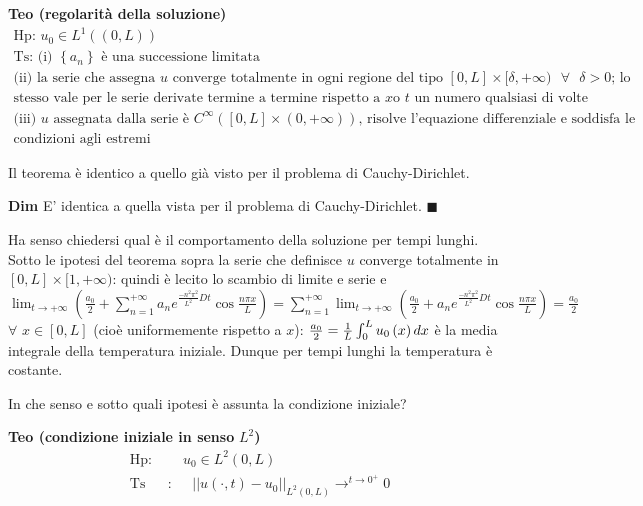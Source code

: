 \documentclass{article}
\begin{document}
\textbf{Teo (regolarit\`{a} della soluzione)}%
\begin{gather*}
\text{Hp: }u_{0}\in L^{1}\left( \left( 0,L\right) \right) \\
\text{Ts: (i) }\left\{ a_{n}\right\} \text{ \`{e} una successione limitata}
\\
\text{(ii) la serie che assegna }u\text{ converge totalmente in ogni regione
del tipo }\left[ 0,L\right] \times \lbrack \delta ,+\infty )\text{ }\forall 
\text{ }\delta >0\text{; lo } \\
\text{stesso vale per le serie derivate termine a termine rispetto a }x\text{
o }t\text{ un numero qualsiasi di volte} \\
\text{(iii) }u\text{ assegnata dalla serie \`{e} }C^{\infty }\left( \left[
0,L\right] \times \left( 0,+\infty \right) \right) \text{, risolve
l'equazione differenziale e soddisfa le} \\
\text{condizioni agli estremi}
\end{gather*}

Il teorema \`{e} identico a quello gi\`{a} visto per il problema di
Cauchy-Dirichlet.

\textbf{Dim} E' identica a quella vista per il problema di Cauchy-Dirichlet. 
$\blacksquare $

Ha senso chiedersi qual \`{e} il comportamento della soluzione per tempi
lunghi. Sotto le ipotesi del teorema sopra la serie che definisce $u$
converge totalmente in $\left[ 0,L\right] \times \lbrack 1,+\infty )$:
quindi \`{e} lecito lo scambio di limite e serie e $\lim_{t\rightarrow
+\infty }\left( \frac{a_{0}}{2}+\sum_{n=1}^{+\infty }a_{n}e^{\frac{-n^{2}\pi
^{2}}{L^{2}}Dt}\cos \frac{n\pi x}{L}\right) =\sum_{n=1}^{+\infty
}\lim_{t\rightarrow +\infty }\left( \frac{a_{0}}{2}+a_{n}e^{\frac{-n^{2}\pi
^{2}}{L^{2}}Dt}\cos \frac{n\pi x}{L}\right) =\frac{a_{0}}{2}$ $\forall $ $%
x\in \left[ 0,L\right] $ (cio\`{e} uniformemente rispetto a $x$): $\frac{%
a_{0}}{2}=\frac{1}{L}\int_{0}^{L}u_{0}\left( x\right) dx$ \`{e} la media
integrale della temperatura iniziale. Dunque per tempi lunghi la temperatura 
\`{e} costante.

In che senso e sotto quali ipotesi \`{e} assunta la condizione iniziale?

\textbf{Teo (condizione iniziale in senso }$L^{2}$\textbf{)}%
\begin{eqnarray*}
\text{Hp}\text{: } &&u_{0}\in L^{2}\left( 0,L\right) \\
\text{Ts} &\text{:}&\text{ }\left\vert \left\vert u\left( \cdot ,t\right)
-u_{0}\right\vert \right\vert _{L^{2}\left( 0,L\right) }\rightarrow
^{t\rightarrow 0^{+}}0
\end{eqnarray*}
\end{document}
